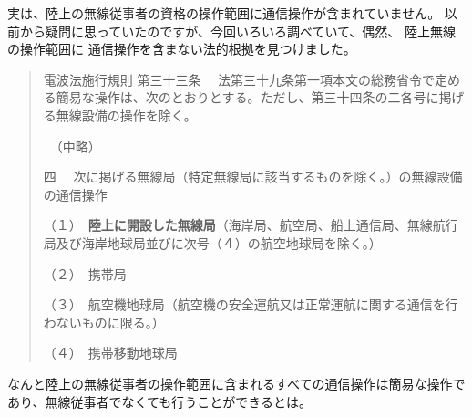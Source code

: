 実は、陸上の無線従事者の資格の操作範囲に通信操作が含まれていません。
以前から疑問に思っていたのですが、今回いろいろ調べていて、偶然、
陸上無線の操作範囲に 通信操作を含まない法的根拠を見つけました。


\begin{quotation}
    電波法施行規則 第三十三条 　法第三十九条第一項本文の総務省令で定める簡易な操作は、次のとおりとする。ただし、第三十四条の二各号に掲げる無線設備の操作を除く。

    　（中略）

    四 　次に掲げる無線局（特定無線局に該当するものを除く。）の無線設備の通信操作

    （１）　\textbf{陸上に開設した無線局}（海岸局、航空局、船上通信局、無線航行局及び海岸地球局並びに次号（４）の航空地球局を除く。）

    （２）　携帯局

    （３）　航空機地球局（航空機の安全運航又は正常運航に関する通信を行わないものに限る。）

    （４）　携帯移動地球局
\end{quotation}

なんと陸上の無線従事者の操作範囲に含まれるすべての通信操作は簡易な操作であり、無線従事者でなくても行うことができるとは。

